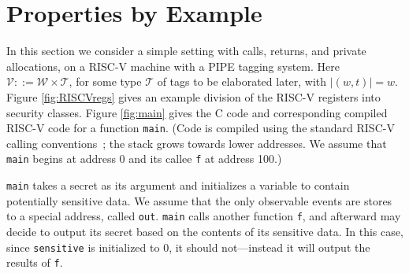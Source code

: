\documentclass[10pt,conference]{ieeetran}%
\theoremstyle{definition}
\begin{document}
\section{Properties by Example}

In this section we consider a simple setting with calls, returns, and private allocations,
on a RISC-V machine with a PIPE tagging system. Here 
\(\mathcal{V} ::= \mathcal{W} \times \mathcal{T}\),
for some type \(\mathcal{T}\) of tags to be elaborated later, with \(|(w,t)| = w\).
Figure \ref{fig:RISCVregs} gives an example division of the RISC-V registers into
security classes. 
Figure \ref{fig:main} gives the C code and corresponding compiled RISC-V code
for a function {\tt main}. (Code is compiled using the standard RISC-V
calling conventions~\cite{??}; the stack grows towards lower addresses. We assume that
{\tt main} begins at address 0 and its callee {\tt f} at address 100.)

{\tt main} takes a secret as its argument and initializes a variable to contain
potentially sensitive data. We assume that the only observable events are stores
to a special address, called {\tt out}. 
{\tt main} calls another function {\tt f},
and afterward may decide to output its secret based on the contents of
its sensitive data. In this case, since {\tt sensitive} is initialized to 0,
it should not---instead it will output the results of {\tt f}.
\end{document}
